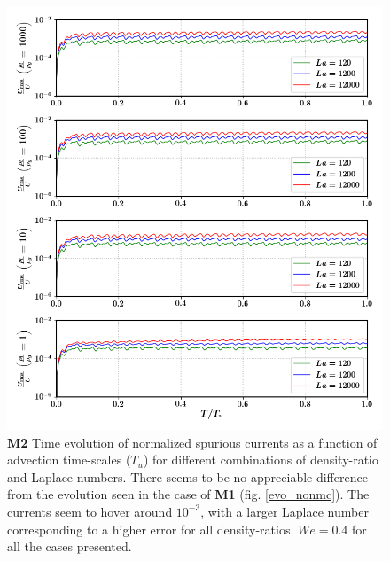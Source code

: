 \begin{figure}[h!]
    \centering
    \includegraphics[]{plots/droplet_advect/evo_daniel.png}
	\caption{\textbf{M2} Time evolution of normalized spurious currents as a function of advection time-scales ($T_u$) for different combinations of density-ratio and Laplace numbers. There seems to be no appreciable difference from the evolution seen in the case of \textbf{M1} (fig. \ref{evo_nonmc}). The currents seem to hover around $10^{-3}$, with a larger Laplace number corresponding to a higher error for all density-ratios. $We = 0.4$ for all the cases presented.}   
    \label{evo_daniel}
\end{figure}

